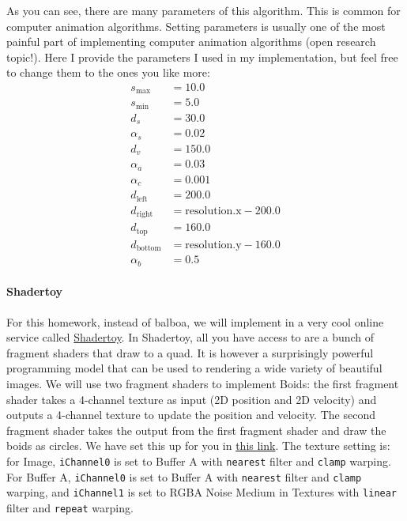 As you can see, there are many parameters of this algorithm. This is common for computer animation algorithms. Setting parameters is usually one of the most painful part of implementing computer animation algorithms (open research topic!). Here I provide the parameters I used in my implementation, but feel free to change them to the ones you like more:
\begin{equation}
\begin{aligned}
s_{\text{max}} &= 10.0 \\
s_{\text{min}} &= 5.0 \\
d_s &= 30.0 \\
\alpha_s &= 0.02 \\
d_v &= 150.0 \\
\alpha_a &= 0.03 \\
\alpha_c &= 0.001 \\
d_{\text{left}} &= 200.0 \\
d_{\text{right}} &= \text{resolution.x} - 200.0 \\
d_{\text{top}} &= 160.0 \\
d_{\text{bottom}} &= \text{resolution.y} - 160.0 \\
\alpha_b &= 0.5
\end{aligned}
\end{equation}

\paragraph{Shadertoy} For this homework, instead of balboa, we will implement in a very cool online service called \href{shadertoy.com}{Shadertoy}. In Shadertoy, all you have access to are a bunch of fragment shaders that draw to a quad. It is however a surprisingly powerful programming model that can be used to rendering a wide variety of beautiful images. We will use two fragment shaders to implement Boids: the first fragment shader takes a 4-channel texture as input (2D position and 2D velocity) and outputs a 4-channel texture to update the position and velocity. The second fragment shader takes the output from the first fragment shader and draw the boids as circles. We have set this up for you in \href{https://www.shadertoy.com/view/ddtyDs}{this link}. The texture setting is: for Image, \lstinline{iChannel0} is set to Buffer A with \lstinline{nearest} filter and \lstinline{clamp} warping. For Buffer A, \lstinline{iChannel0} is set to Buffer A with \lstinline{nearest} filter and \lstinline{clamp} warping, and \lstinline{iChannel1} is set to RGBA Noise Medium in Textures with \lstinline{linear} filter and \lstinline{repeat} warping.

